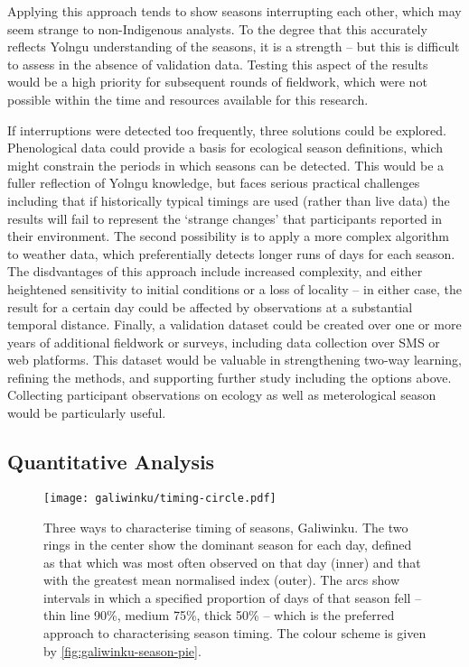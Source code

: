 Applying this approach tends to show seasons interrupting each other, which may
seem strange to non-Indigenous analysts.  To the degree that this accurately
reflects Yolngu understanding of the seasons, it is a strength -- but this is
difficult to assess in the absence of validation data.  Testing this aspect of the
results would be a high priority for subsequent rounds of fieldwork, which
were not possible within the time and resources available for this research.

If interruptions were detected too frequently, three solutions could be explored.
Phenological data could provide a basis for ecological season definitions,
which might constrain the periods in which seasons can be detected.
This would be a fuller reflection of Yolngu knowledge, but faces serious
practical challenges including that if historically typical timings are used
(rather than live data) the results will fail to represent the `strange changes'
that participants reported in their environment.
%
The second possibility is to apply a more complex algorithm to weather data,
which preferentially detects longer runs of days for each season.  The disdvantages
of this approach include increased complexity, and either heightened sensitivity
to initial conditions or a loss of locality -- in either case, the result for
a certain day could be affected by observations at a substantial temporal distance.
%
Finally, a validation dataset could be created over one or more years of
additional fieldwork or surveys, including data collection over SMS or web
platforms.  This dataset would be valuable in strengthening two-way learning,
refining the methods, and supporting further study including the options above.
Collecting participant observations on ecology as well as meterological
season would be particularly useful.


\subsection{Quantitative Analysis}
\label{subsec:disc-season-characterisation}

\begin{figure}[p]
    \centerline{
    \texttt{[image: galiwinku/timing-circle.pdf]}}
    \caption[Three ways to characterise timing of seasons, Galiwinku]{
        Three ways to characterise timing of seasons, Galiwinku.
        The two rings in the center show the dominant season for each day,
        defined as that which was most often observed on that day (inner)
        and that with the greatest mean normalised index (outer).
        The arcs show intervals in which a specified proportion of days
        of that season fell -- thin line 90\%, medium 75\%, thick 50\% --
        which is the preferred approach to characterising season timing.
        The colour scheme is given by \cref{fig:galiwinku-season-pie}.
        }
    \label{fig:galiwinku-timing-circle}
\end{figure}

